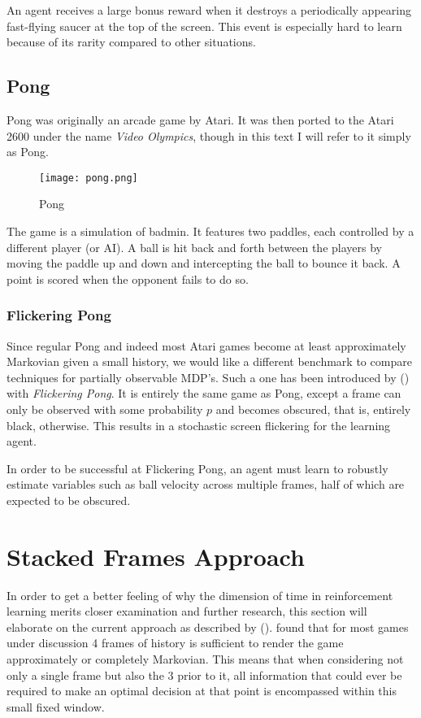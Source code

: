 An agent receives a large bonus reward
when it destroys a periodically appearing fast-flying saucer
at the top of the screen.
This event is especially hard to learn because
of its rarity compared to other situations.


\subsection{Pong}
\label{sub:pong}
Pong was originally an arcade game by Atari.
It was then ported to the Atari 2600
under the name \textit{Video Olympics},
though in this text I will refer to it simply as Pong.

\begin{figure}[htpb]
  \centering
  \texttt{[image: pong.png]}
  \caption{Pong}
  \label{fig:pong}
\end{figure}

The game is a simulation of badmin.
It features two paddles,
each controlled by a different player (or AI).
A ball is hit back and forth between the players
by moving the paddle up and down
and intercepting the ball to bounce it back.
A point is scored when the opponent
fails to do so.

\subsubsection{Flickering Pong}
\label{sec:flickering_pong}
Since regular Pong and indeed most Atari games
become at least approximately Markovian
given a small history,
we would like a different benchmark
to compare techniques
for partially observable MDP's.
Such a one has been introduced by \citeauthor{Hausknecht2015} (\citeyear{Hausknecht2015})
with \textit{Flickering Pong}.
It is entirely the same game as Pong,
except a frame can only be observed with some probability $p$
and becomes obscured, that is, entirely black, otherwise.
This results in a stochastic screen flickering for the learning agent.

In order to be successful at Flickering Pong,
an agent must learn to robustly
estimate variables such as ball velocity
across multiple frames,
half of which are expected to be obscured.

\section{Stacked Frames Approach}
\label{sec:stacked_frames_approach}
In order to get a better feeling
of why the dimension of time in reinforcement learning
merits closer examination and further research,
this section will elaborate on the current approach
as described by
\citeauthor{Mnih2013} (\citeyear{Mnih2013}).
\citeauthor{Mnih2013}
found that for most games under discussion
4 frames of history is sufficient to render the game approximately
or completely Markovian.
This means that when considering not only a single frame
but also the 3 prior to it,
all information that could ever be required to make an optimal decision
at that point is encompassed within this small fixed window.

